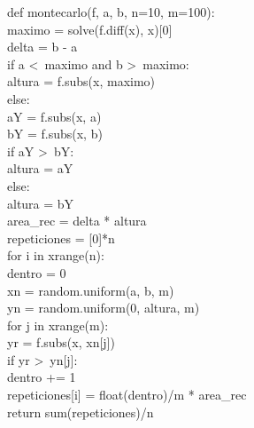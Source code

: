 \documentclass[10pt,letterpaper]{article}
\newenvironment{Code}
{
\begin{lrbox}{\selvestebox}%
\begin{minipage}{\dimexpr\columnwidth-2\fboxsep\relax}
\fontfamily{\ttdefault}\selectfont
}
{\end{minipage}\end{lrbox}%
\begin{center}
\colorbox{light-gray}{\usebox{\selvestebox}}
\end{center}
}
\begin{document}
\begin{footnotesize}
\begin{Code}
def montecarlo(f, a, b, n=10, m=100):\\
\hspace*{5mm} maximo = solve(f.diff(x), x)[0]\\
\hspace*{5mm} delta = b - a\\
\hspace*{5mm} if a <\ maximo and b >\ maximo:\\
\hspace*{11mm} altura = f.subs(x, maximo)\\
\hspace*{5mm} else:\\
\hspace*{11mm} aY = f.subs(x, a)\\
\hspace*{11mm} bY = f.subs(x, b)\\
\hspace*{11mm} if aY >\ bY:\\
\hspace*{17mm} altura = aY\\
\hspace*{11mm} else:\\
\hspace*{17mm} altura = bY\\
\hspace*{5mm} area\_rec = delta * altura\\
\hspace*{5mm} repeticiones = [0]*n\\
\hspace*{5mm} for i in xrange(n):\\
\hspace*{11mm} dentro = 0\\
\hspace*{11mm} xn = random.uniform(a, b, m)\\
\hspace*{11mm} yn = random.uniform(0, altura, m)\\
\hspace*{11mm} for j in xrange(m):\\
\hspace*{17mm} yr = f.subs(x, xn[j])\\
\hspace*{17mm} if yr >\ yn[j]:\\
\hspace*{23mm} dentro += 1\\
\hspace*{11mm} repeticiones[i] = float(dentro)/m * area\_rec\\
\hspace*{5mm} return sum(repeticiones)/n
\end{Code}
\end{footnotesize}
\end{document}

